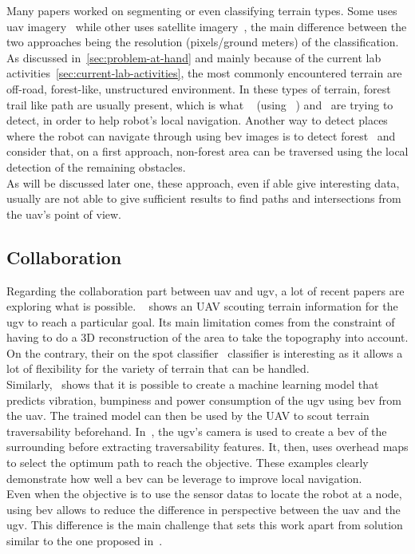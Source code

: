 Many papers worked on segmenting or even classifying terrain types.
Some uses \gls{uav} imagery~\parencite{khan_visual_2012} while other uses satellite imagery~\parencite{sofman_terrain_2006},
the main difference between the two approaches being the resolution (pixels/ground meters) of the classification.
As discussed in~\ref{sec:problem-at-hand} and mainly because of the current lab activities~\ref{sec:current-lab-activities},
the most commonly encountered terrain are off-road, forest-like, unstructured environment.
In these types of terrain, forest trail like path are usually present, which is what ~\cite{rasmussen_appearance_2009} (using ~\cite{rufus_blas_fast_2008})
and~\cite{giusti_machine_2016} are trying to detect, in order to help robot's local navigation.
Another way to detect places where the robot can navigate through using \gls{bev} images is to detect forest~\parencite{bosch_journal_2020}
and consider that, on a first approach, non-forest area can be traversed using the local detection of the remaining obstacles.\\
As will be discussed later one, these approach, even if able give interesting data, usually are not able to give
sufficient results to find paths and intersections from the \gls{uav}'s point of view.

\subsection{Collaboration}\label{subsec:collaboration}

Regarding the collaboration part between \gls{uav} and \gls{ugv}, a lot of recent papers are exploring what is possible.
~\cite{delmerico_active_2017} shows an UAV scouting terrain information for the \gls{ugv} to reach a particular goal.
Its main limitation comes from the constraint of having to do a 3D reconstruction of the area to take the topography
into account.
On the contrary, their on the spot classifier~\parencite{kulic_--spot_2017} classifier is interesting as it allows
a lot of flexibility for the variety of terrain that can be handled.\\
Similarly,~\cite{fortin_uav-assisted_2024} shows that it is possible to create a machine learning model that predicts
vibration, bumpiness and power consumption of the \gls{ugv} using \gls{bev} from the \gls{uav}.
The trained model can then be used by the UAV to scout terrain traversability beforehand.
In~\cite{zhang_dual-bev_2025}, the \gls{ugv}'s camera is used to create a \gls{bev} of the surrounding before extracting traversability features.
It, then, uses overhead maps to select the optimum path to reach the objective.
These examples clearly demonstrate how well a \gls{bev} can be leverage to improve local navigation.\\
Even when the objective is to use the sensor datas to locate the robot at a node, using \gls{bev} allows to reduce
the difference in perspective between the \gls{uav} and the \gls{ugv}.
This difference is the main challenge that sets this work apart from solution similar to the one proposed in~\cite{han_effective_2020}.


